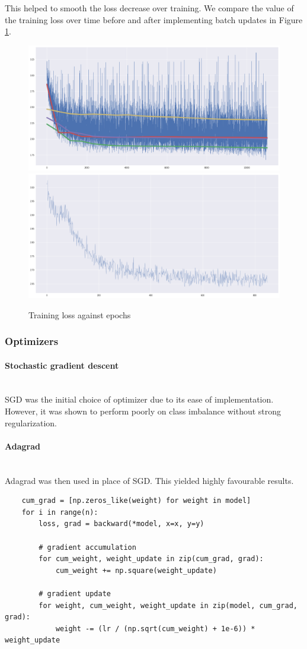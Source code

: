 \documentclass{article}
\numberwithin{equation}{section}
\begin{document}
This helped to smooth the loss decrease over training. We compare the value of the training loss over time before and after implementing batch updates in Figure \ref{fig:batch-updates}.

\begin{figure}[h]
	\centering
	\includegraphics[width=0.45\linewidth]{assets/loss_nobatch.png}
	\includegraphics[width=0.45\linewidth]{assets/loss_batch.png}
	\caption{Training loss against epochs}
	\label{fig:batch-updates}
\end{figure}

\subsubsection{Optimizers}
\paragraph{Stochastic gradient descent}\mbox{}\\
SGD was the initial choice of optimizer due to its ease of implementation. However, it was shown to perform poorly on class imbalance without strong regularization.

\paragraph{Adagrad}\mbox{}\\
Adagrad was then used in place of SGD. This yielded highly favourable results.

\begin{verbatim}
    cum_grad = [np.zeros_like(weight) for weight in model]
    for i in range(n):
        loss, grad = backward(*model, x=x, y=y)

        # gradient accumulation
        for cum_weight, weight_update in zip(cum_grad, grad):
            cum_weight += np.square(weight_update)

        # gradient update
        for weight, cum_weight, weight_update in zip(model, cum_grad, grad):
            weight -= (lr / (np.sqrt(cum_weight) + 1e-6)) * weight_update
\end{verbatim}
\end{document}

